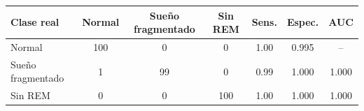 \begin{tabular}{lcccccc}
\toprule
\textbf{Clase real} & \textbf{Normal} & \textbf{Sueño fragmentado} & \textbf{Sin REM} & \textbf{Sens.} & \textbf{Espec.} & \textbf{AUC} \\
\midrule
Normal & 100 & 0 & 0 & 1.00 & 0.995 & -- \\
Sueño fragmentado & 1 & 99 & 0 & 0.99 & 1.000 & 1.000 \\
Sin REM & 0 & 0 & 100 & 1.00 & 1.000 & 1.000 \\
\bottomrule
\end{tabular}
